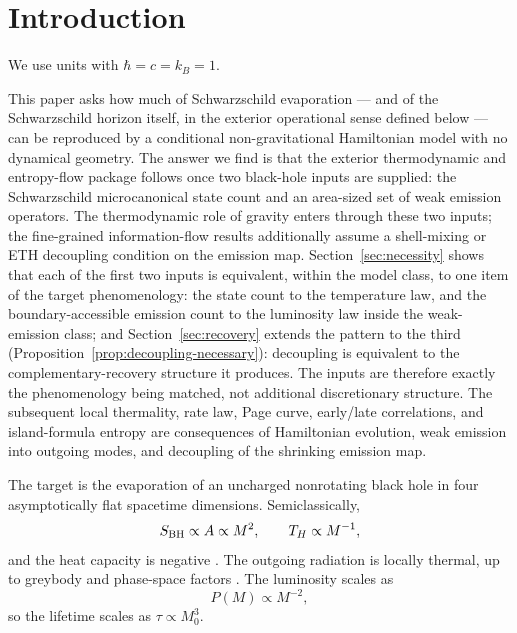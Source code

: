 \documentclass[12pt]{article}
\begin{document}
\section{Introduction}

We use units with $\hbar=c=k_B=1$.

This paper asks how much of Schwarzschild evaporation --- and of the
Schwarzschild horizon itself, in the exterior operational sense defined
below --- can be reproduced by a
conditional non-gravitational Hamiltonian model with no dynamical geometry.  The answer we find is
that the exterior thermodynamic and entropy-flow package follows once two
black-hole inputs are supplied: the Schwarzschild microcanonical state count
and an area-sized set of weak emission operators.  The thermodynamic role of
gravity enters through these two inputs; the fine-grained information-flow
results additionally assume a shell-mixing or ETH decoupling condition on
the emission map.  Section~\ref{sec:necessity} shows that each
of the first two inputs is equivalent, within the model class, to one item
of the target phenomenology: the state count to the temperature law, and the
boundary-accessible emission count to the luminosity law inside the
weak-emission class; and
Section~\ref{sec:recovery} extends the pattern to the third
(Proposition~\ref{prop:decoupling-necessary}): decoupling is equivalent to
the complementary-recovery structure it produces.  The inputs are
therefore exactly the phenomenology being matched, not additional
discretionary structure.  The subsequent local thermality, rate law, Page
curve, early/late correlations, and island-formula entropy are consequences
of Hamiltonian evolution, weak emission into outgoing modes, and decoupling
of the shrinking emission map.

The target is the evaporation of an uncharged nonrotating black hole in four
asymptotically flat spacetime dimensions.  Semiclassically,
\begin{equation}
    S_{\rm BH}\propto A\propto M^2,\qquad
    T_H\propto M^{-1},
\end{equation}
and the heat capacity is negative \cite{Bekenstein1973,Hawking1975}.  The
outgoing radiation is locally thermal, up to greybody and phase-space factors
\cite{Hawking1975,Page1976}.  The luminosity scales as
\begin{equation}
    P(M)\propto M^{-2},
\end{equation}
so the lifetime scales as $\tau\propto M_0^3$.
\end{document}
